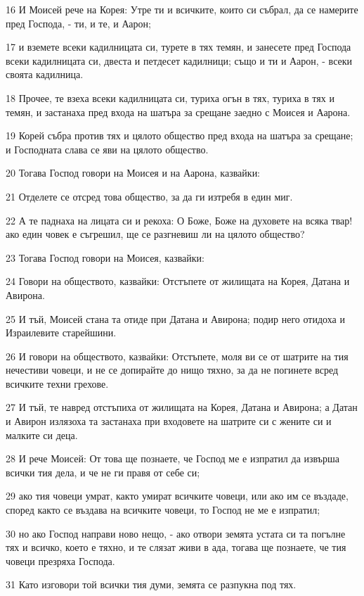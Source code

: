 \par 16 И Моисей рече на Корея: Утре ти и всичките, които си събрал, да се намерите пред Господа, - ти, и те, и Аарон;
\par 17 и вземете всеки кадилницата си, турете в тях темян, и занесете пред Господа всеки кадилницата си, двеста и петдесет кадилници; също и ти и Аарон, - всеки своята кадилница.
\par 18 Прочее, те взеха всеки кадилницата си, туриха огън в тях, туриха в тях и темян, и застанаха пред входа на шатъра за срещане заедно с Моисея и Аарона.
\par 19 Корей събра против тях и цялото общество пред входа на шатъра за срещане; и Господната слава се яви на цялото общество.
\par 20 Тогава Господ говори на Моисея и на Аарона, казвайки:
\par 21 Отделете се отсред това общество, за да ги изтребя в един миг.
\par 22 А те паднаха на лицата си и рекоха: О Боже, Боже на духовете на всяка твар! ако един човек е съгрешил, ще се разгневиш ли на цялото общество?
\par 23 Тогава Господ говори на Моисея, казвайки:
\par 24 Говори на обществото, казвайки: Отстъпете от жилищата на Корея, Датана и Авирона.
\par 25 И тъй, Моисей стана та отиде при Датана и Авирона; подир него отидоха и Израилевите старейшини.
\par 26 И говори на обществото, казвайки: Отстъпете, моля ви се от шатрите на тия нечестиви човеци, и не се допирайте до нищо тяхно, за да не погинете всред всичките техни грехове.
\par 27 И тъй, те навред отстъпиха от жилищата на Корея, Датана и Авирона; а Датан и Авирон излязоха та застанаха при входовете на шатрите си с жените си и малките си деца.
\par 28 И рече Моисей: От това ще познаете, че Господ ме е изпратил да извърша всички тия дела, и че не ги правя от себе си;
\par 29 ако тия човеци умрат, както умират всичките човеци, или ако им се въздаде, според както се въздава на всичките човеци, то Господ не ме е изпратил;
\par 30 но ако Господ направи ново нещо, - ако отвори земята устата си та погълне тях и всичко, което е тяхно, и те слязат живи в ада, тогава ще познаете, че тия човеци презряха Господа.
\par 31 Като изговори той всички тия думи, земята се разпукна под тях.
